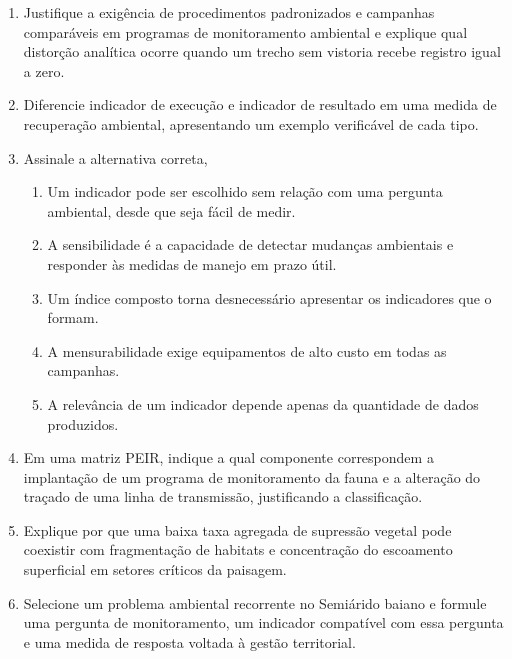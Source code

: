 \documentclass[11pt,a4paper]{article}
\begin{document}
\begin{enumerate}[leftmargin=*, itemsep=6pt]
  \item Justifique a exigência de procedimentos padronizados e campanhas comparáveis em programas de monitoramento ambiental e explique qual distorção analítica ocorre quando um trecho sem vistoria recebe registro igual a zero.

  \item Diferencie indicador de execução e indicador de resultado em uma medida de recuperação ambiental, apresentando um exemplo verificável de cada tipo.

  \item Assinale a alternativa correta,
  \begin{enumerate}[label=(\Alph*), leftmargin=1.5em, itemsep=2pt, topsep=3pt]
    \item Um indicador pode ser escolhido sem relação com uma pergunta ambiental, desde que seja fácil de medir.
    \item A sensibilidade é a capacidade de detectar mudanças ambientais e responder às medidas de manejo em prazo útil.
    \item Um índice composto torna desnecessário apresentar os indicadores que o formam.
    \item A mensurabilidade exige equipamentos de alto custo em todas as campanhas.
    \item A relevância de um indicador depende apenas da quantidade de dados produzidos.
  \end{enumerate}

  \item Em uma matriz PEIR, indique a qual componente correspondem a implantação de um programa de monitoramento da fauna e a alteração do traçado de uma linha de transmissão, justificando a classificação.

  \item Explique por que uma baixa taxa agregada de supressão vegetal pode coexistir com fragmentação de habitats e concentração do escoamento superficial em setores críticos da paisagem.

  \item Selecione um problema ambiental recorrente no Semiárido baiano e formule uma pergunta de monitoramento, um indicador compatível com essa pergunta e uma medida de resposta voltada à gestão territorial.
\end{enumerate}
\end{document}
